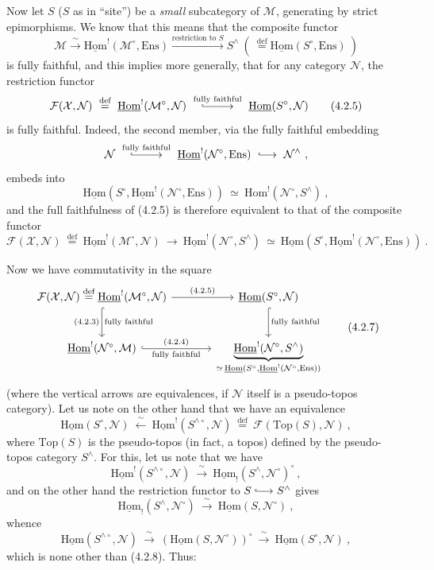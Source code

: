 \documentclass[11pt]{article}
\newcommand{\printedpage}[1]{\marginpar{\footnotesize p.~#1}}
\newcommand{\msp}[1]{\marginpar{\footnotesize [#1]}}
\newcommand{\cM}{\mathcal{M}}
\newcommand{\cN}{\mathcal{N}}
\newcommand{\cX}{\mathcal{X}}
\newcommand{\cF}{\mathcal{F}}
\newcommand{\uHom}{\underline{\mathrm{Hom}}}
\newcommand{\Hom}{\mathrm{Hom}}
\newcommand{\Ens}{\mathrm{Ens}}
\newcommand{\Top}{\mathrm{Top}}
\newcommand{\defeq}{\overset{\text{def}}{=}}
\newcommand{\linj}{\lhook\joinrel\longrightarrow}
\begin{document}
Now let $S$ ($S$ as in ``site'') be a \textit{small} subcategory of $\cM$, generating by strict epimorphisms. We know that this means that the composite functor
\[
\cM \xrightarrow{\ \sim\ } \uHom^{!}(\cM^{\circ},\Ens) \xrightarrow{\text{restriction to } S} S^{\wedge} \ (\ \defeq \uHom(S^{\circ},\Ens)\ )
\tag*{(4.2.4)}
\]
is fully faithful, and this implies more generally, that for any category $\cN$, the restriction functor
\[
\cF(\cX,\cN) \ \defeq\ \uHom^{!}(\cM^{\circ},\cN) \ \overset{\text{fully faithful}}{\lhook\joinrel\relbar\joinrel\relbar\joinrel\longrightarrow}\ \uHom(S^{\circ},\cN)
\tag*{(4.2.5)}
\]
is fully faithful. Indeed, the second member, via the fully faithful embedding
\[
\cN \ \overset{\text{fully faithful}}{\lhook\joinrel\relbar\joinrel\relbar\joinrel\longrightarrow}\ \uHom^{!}(\cN^{\circ},\Ens) \ \linj\ \cN^{\wedge} \ ,
\]
embeds into
\[
\uHom(S^{\circ},\uHom^{!}(\cN^{\circ},\Ens)) \ \simeq\ \Hom^{!}(\cN^{\circ},S^{\wedge}) \ ,
\]
and the full faithfulness of (4.2.5) is therefore equivalent to that of the composite functor
\[
\cF(\cX,\cN) \ \defeq\ \uHom^{!}(\cM^{\circ},\cN) \ \longrightarrow\ \uHom^{!}(\cN^{\circ},S^{\wedge}) \ \simeq\ \uHom(S^{\circ},\uHom^{!}(\cN^{\circ},\Ens)) \ .
\tag*{(4.2.6)}
\]

\msp{page 60}
Now we have commutativity in the square
\[
\begin{tikzcd}[column sep=large, row sep=large]
\cF(\cX,\cN) \defeq \uHom^{!}(\cM^{\circ},\cN) \arrow[r, "\text{\scriptsize(4.2.5)}"] \arrow[d, hook, "\text{\scriptsize(4.2.3)}"', "\text{\scriptsize fully faithful}"] & \uHom(S^{\circ},\cN) \arrow[d, hook, "\text{\scriptsize fully faithful}"] \\
\uHom^{!}(\cN^{\circ},\cM) \arrow[r, hook, "\text{\scriptsize(4.2.4)}", "\text{\scriptsize fully faithful}"'] & \underbrace{\uHom^{!}(\cN^{\circ},S^{\wedge})}_{\simeq\, \uHom(S^{\circ},\uHom^{!}(\cN^{\circ},\Ens))}
\end{tikzcd}
\tag*{(4.2.7)}
\]
(where the vertical arrows are equivalences, if $\cN$ itself is a pseudo-topos category). Let us note on the other hand that we have an equivalence
\[
\uHom(S^{\circ},\cN) \ \xleftarrow{\ \sim\ }\ \uHom^{!}(S^{\wedge\circ},\cN) \ \defeq\ \cF(\Top(S),\cN) \ ,
\tag*{(4.2.8)}
\]
where $\Top(S)$ is the pseudo-topos (in fact, a topos) defined by the pseudo-topos category $S^{\wedge}$. For this, let us note that we have
\[
\uHom^{!}(S^{\wedge\circ},\cN) \ \xrightarrow{\ \sim\ }\ \uHom_{!}(S^{\wedge},\cN^{\circ})^{\circ} \ ,
\]
and on the other hand the restriction functor to $S \linj S^{\wedge}$ gives
\[
\uHom_{!}(S^{\wedge},\cN^{\circ}) \ \xrightarrow{\ \sim\ }\ \uHom(S,\cN^{\circ}) \ ,
\]
whence
\printedpage{6}
\msp{page 61}
\[
\uHom(S^{\wedge\circ},\cN) \ \xrightarrow{\ \sim\ }\ (\uHom(S,\cN^{\circ}))^{\circ} \ \xrightarrow{\ \sim\ }\ \uHom(S^{\circ},\cN) \ ,
\]
which is none other than (4.2.8). Thus:
\end{document}
